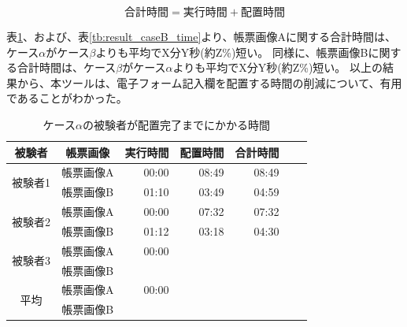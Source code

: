 \begin{equation}\label{eq:sum_time}
    合計時間=実行時間+配置時間
\end{equation}

表\ref{tb:result_caseA_time}、および、表\ref{tb:result_caseB_time}より、帳票画像Aに関する合計時間は、ケース$\alpha$がケース$\beta$よりも平均でX分Y秒(約Z\%)短い。
同様に、帳票画像Bに関する合計時間は、ケース$\beta$がケース$\alpha$よりも平均でX分Y秒(約Z\%)短い。
以上の結果から、本ツールは、電子フォーム記入欄を配置する時間の削減について、有用であることがわかった。

\begin{table}[t]
	\caption{ケース$\alpha$の被験者が配置完了までにかかる時間}
	\label{tb:result_caseA_time}
	\centering
	\begin{tabular}{cc||rrrr|r}
		被験者 & 帳票画像 & 実行時間 & 配置時間 & 合計時間 \\
        \hline \hline

		\multirow{2}{*}{被験者1} & 帳票画像A & 00:00 & 08:49 & 08:49 \\
		                        & 帳票画像B & 01:10 & 03:49 & 04:59 \\
                                \hline

		\multirow{2}{*}{被験者2} & 帳票画像A & 00:00 & 07:32 & 07:32 \\
                                & 帳票画像B & 01:12 & 03:18 & 04:30 \\
                                \hline

		\multirow{2}{*}{被験者3} & 帳票画像A & 00:00 &  &  \\
                                & 帳票画像B & &  &  \\
                                \hline \hline

		\multirow{2}{*}{平均}  & 帳票画像A & 00:00 &  &  \\
                              & 帳票画像B &  &  &  \\
	\end{tabular}
\end{table}

